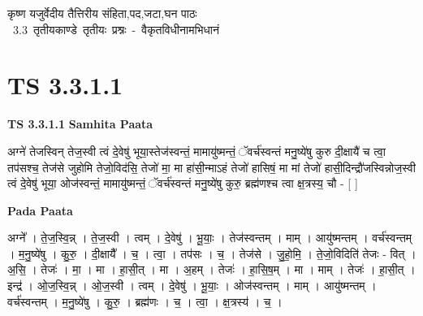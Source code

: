 \documentclass[17pt]{extarticle}
\begin{document}
\begin{titlepage}
    \begin{center}
 
\begin{sanskrit}
    { \Large
    कृष्ण यजुर्वेदीय तैत्तिरीय संहिता,पद,जटा,घन पाठः 
    }
    \\
    \vspace{2.5cm}
    \mbox{ \Large
    3.3     तृतीयकाण्डे तृतीयः प्रश्नः - वैकृतविधीनामभिधानं   }
\end{sanskrit}
\end{center}

\end{titlepage}
\tableofcontents
{}
\pagebreak


\section{ TS 3.3.1.1 }

\textbf{TS 3.3.1.1 } \newline
\textbf{Samhita Paata} \newline

अग्ने॑ तेजस्विन् तेज॒स्वी त्वं दे॒वेषु॑ भूया॒स्तेज॑स्वन्तं॒ मामायु॑ष्मन्तं॒ ॅवर्च॑स्वन्तं मनु॒ष्ये॑षु कुरु दी॒क्षायै॑ च त्वा॒ तप॑सश्च॒ तेज॑से जुहोमि तेजो॒विद॑सि॒ तेजो॑ मा॒ मा हा॑सी॒न्माऽहं तेजो॑ हासिषं॒ मा मां तेजो॑ हासी॒दिन्द्रौ॑जस्विन्नोज॒स्वी त्वं दे॒वेषु॑ भूया॒ ओज॑स्वन्तं॒ मामायु॑ष्मन्तं॒ ॅवर्च॑स्वन्तं मनु॒ष्ये॑षु कुरु॒ ब्रह्म॑णश्च त्वा क्ष॒त्रस्य॒ चौ - [  ] \newline

\textbf{Pada Paata} \newline

अग्ने᳚ । ते॒ज॒स्वि॒न्न् । ते॒ज॒स्वी । त्वम् । दे॒वेषु॑ । भू॒याः॒ । तेज॑स्वन्तम् । माम् । आयु॑ष्मन्तम् । वर्च॑स्वन्तम् । म॒नु॒ष्ये॑षु । कु॒रु॒ । दी॒क्षायै᳚ । च॒ । त्वा॒ । तप॑सः । च॒ । तेज॑से । जु॒हो॒मि॒ । ते॒जो॒विदिति॑ तेजः - वित् । अ॒सि॒ । तेजः॑ । मा॒ । मा । हा॒सी॒त् । मा । अ॒हम् । तेजः॑ । हा॒सि॒ष॒म् । मा । माम् । तेजः॑ । हा॒सी॒त् । इन्द्र॑ । ओ॒ज॒स्वि॒न्न् । ओ॒ज॒स्वी । त्वम् । दे॒वेषु॑ । भू॒याः॒ । ओज॑स्वन्तम् । माम् । आयु॑ष्मन्तम् । वर्च॑स्वन्तम् । म॒नु॒ष्ये॑षु । कु॒रु॒ । ब्रह्म॑णः । च॒ । त्वा॒ । क्ष॒त्रस्य॑ । च॒ ।  \newline




\end{document}
